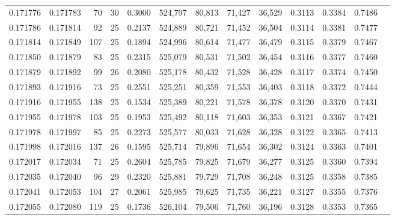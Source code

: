 \begin{tabular}{rrrrrrrrrrrrr}
0.171776 & 0.171783 &  70 &  30 &                                     0.3000 & 524,797 &  80,813 &  71,427 &  36,529 & 0.3113 & 0.3384 & 0.7486 \\
0.171786 & 0.171814 &  92 &  25 &                                     0.2137 & 524,889 &  80,721 &  71,452 &  36,504 & 0.3114 & 0.3381 & 0.7477 \\
0.171814 & 0.171849 & 107 &  25 &                                     0.1894 & 524,996 &  80,614 &  71,477 &  36,479 & 0.3115 & 0.3379 & 0.7467 \\
0.171850 & 0.171879 &  83 &  25 &                                     0.2315 & 525,079 &  80,531 &  71,502 &  36,454 & 0.3116 & 0.3377 & 0.7460 \\
0.171879 & 0.171892 &  99 &  26 &                                     0.2080 & 525,178 &  80,432 &  71,528 &  36,428 & 0.3117 & 0.3374 & 0.7450 \\
0.171893 & 0.171916 &  73 &  25 &                                     0.2551 & 525,251 &  80,359 &  71,553 &  36,403 & 0.3118 & 0.3372 & 0.7444 \\
0.171916 & 0.171955 & 138 &  25 &                                     0.1534 & 525,389 &  80,221 &  71,578 &  36,378 & 0.3120 & 0.3370 & 0.7431 \\
0.171955 & 0.171978 & 103 &  25 &                                     0.1953 & 525,492 &  80,118 &  71,603 &  36,353 & 0.3121 & 0.3367 & 0.7421 \\
0.171978 & 0.171997 &  85 &  25 &                                     0.2273 & 525,577 &  80,033 &  71,628 &  36,328 & 0.3122 & 0.3365 & 0.7413 \\
0.171998 & 0.172016 & 137 &  26 &                                     0.1595 & 525,714 &  79,896 &  71,654 &  36,302 & 0.3124 & 0.3363 & 0.7401 \\
0.172017 & 0.172034 &  71 &  25 &                                     0.2604 & 525,785 &  79,825 &  71,679 &  36,277 & 0.3125 & 0.3360 & 0.7394 \\
0.172035 & 0.172040 &  96 &  29 &                                     0.2320 & 525,881 &  79,729 &  71,708 &  36,248 & 0.3125 & 0.3358 & 0.7385 \\
0.172041 & 0.172053 & 104 &  27 &                                     0.2061 & 525,985 &  79,625 &  71,735 &  36,221 & 0.3127 & 0.3355 & 0.7376 \\
0.172055 & 0.172080 & 119 &  25 &                                     0.1736 & 526,104 &  79,506 &  71,760 &  36,196 & 0.3128 & 0.3353 & 0.7365 \\

\end{tabular}
